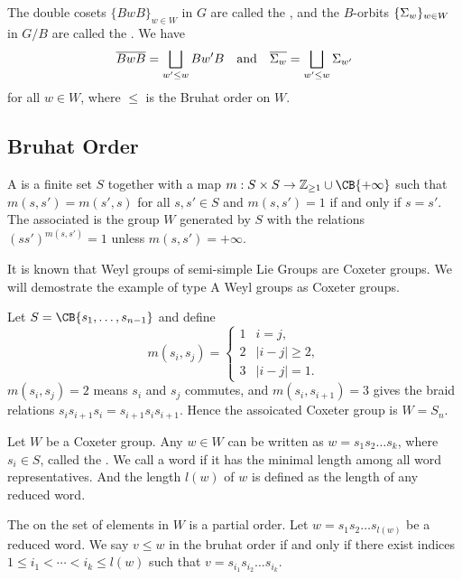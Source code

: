 The double cosets $\{BwB\}_{w \in W}$ in $G$ are called the , and the $B$-orbits $\{\Sigma_w\}_{w \in W}$ in $G/B$ are called the . We have
\begin{equation*}
    \overline{BwB} = \bigsqcup_{w' \leq w} Bw'B \quad \text{and} \quad \overline{\Sigma_w} = \bigsqcup_{w' \leq w} \Sigma_{w'}
\end{equation*}
for all $w \in W$, where $\leq$ is the Bruhat order on $W$.

\subsection{Bruhat Order}

\begin{definition}[def:]{}
    A  is a finite set $S$ together with a map
    $m:S\times S\rightarrow \mathbb{Z}_{\geq 1}\cup \CB{+\infty }$ such that $m(s,s')=m(s',s)$ for all $s,s'\in S$ and $m(s,s')=1$ if and only if $s=s'$. The associated  is the group $W$ generated by $S$ with the relations $(ss')^{m(s,s')}=1$ unless $m(s,s')=+\infty$.
\end{definition}

It is known that Weyl groups of semi-simple Lie Groups are Coxeter groups.
We will demostrate the example of type A Weyl groups as Coxeter groups.

\begin{example}[exp:]{}
    Let $S=\CB{s_1,\dots ,s_{n-1}}$ and define
    \[
        m(s_i,s_j)
        =
        \begin{cases}
            1 & i=j,\\
            2 & |i-j|\geq 2,\\
            3 & |i-j|=1.
        \end{cases}
    \]
    $m(s_i,s_j)=2$ means $s_i$ and $s_j$ commutes, and $m(s_i,s_{i+1})=3$ gives the braid relations $s_is_{i+1}s_i=s_{i+1}s_is_{i+1}$.
    Hence the assoicated Coxeter group is $W=S_n$.
\end{example}

Let $W$ be a Coxeter group.
Any $w\in W$ can be written as $w=s_1s_2\dots s_k$, where $s_i\in S$, called the . We call a word  if it has the minimal length among all word representatives. And the length $l(w)$ of $w$ is defined as the length of any reduced word.

The  on the set of elements in $W$ is a partial order. Let $w=s_1s_2\dots s_{l(w)}$ be a reduced word. We say $v\leq w$ in the bruhat order if and only if there exist indices $1\leq i_1<\cdots <i_k\leq l(w)$ such that $v=s_{i_1}s_{i_2}\dots s_{i_k}$.


